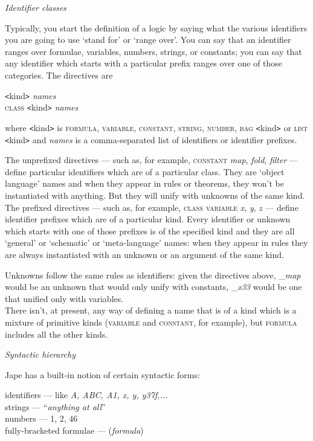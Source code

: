 \textit{Identifier classes}


Typically, you start the definition of a logic by saying what the various identifiers you are going to use `stand for' or `range over'. You can say that an identifier ranges over formulae, variables, numbers, strings, or constants; you can say that any identifier which starts with a particular prefix ranges over one of those categories. The directives are

\texttt{<}kind\texttt{>} \textit{names}\\
\textsc{class} \texttt{<}kind\texttt{>} \textit{names}


where \texttt{<}kind\texttt{>} is \textsc{formula, variable}, \textsc{constant, string}, \textsc{number}, \textsc{bag} \texttt{<}kind\texttt{>} or \textsc{list} \texttt{<}kind\texttt{>} and \textit{names} is a comma-separated list of identifiers or identifier prefixes.


The unprefixed directives --- such as, for example, \textsc{constant} \textit{map}, \textit{fold}, \textit{filter} --- define particular identifiers which are of a particular class. They are `object language' names and when they appear in rules or theorems, they won't be instantiated with anything. But they will unify with unknowns of the same kind.\\
The prefixed directives --- such as, for example, \textsc{class variable} \textit{x}, \textit{y}, $z$ --- define identifier prefixes which are of a particular kind. Every identifier or unknown which starts with one of those prefixes is of the specified kind and they are all `general' or `schematic' or `meta-language' names: when they appear in rules they are always instantiated with an unknown or an argument of the same kind.


Unknowns follow the same rules as identifiers: given the directives above, \_\textit{map} would be an unknown that would only unify with constants, \_\textit{x33} would be one that unified only with variables.\\
There isn't, at present, any way of defining a name that is of a kind which is a mixture of primitive kinds (\textsc{variable} and \textsc{constant}, for example), but \textsc{formula} includes all the other kinds.


\textit{Syntactic hierarchy}


Jape has a built-in notion of certain syntactic forms:


{\textbullet}\tab identifiers --- like \textit{A, ABC, A1, x, y, y37f,...} \\
{\textbullet}\tab strings --- ``\textit{anything at all}'' \\
{\textbullet}\tab numbers --- 1, 2, 46 \\
{\textbullet}\tab fully-bracketed formulae --- (\textit{formula})


